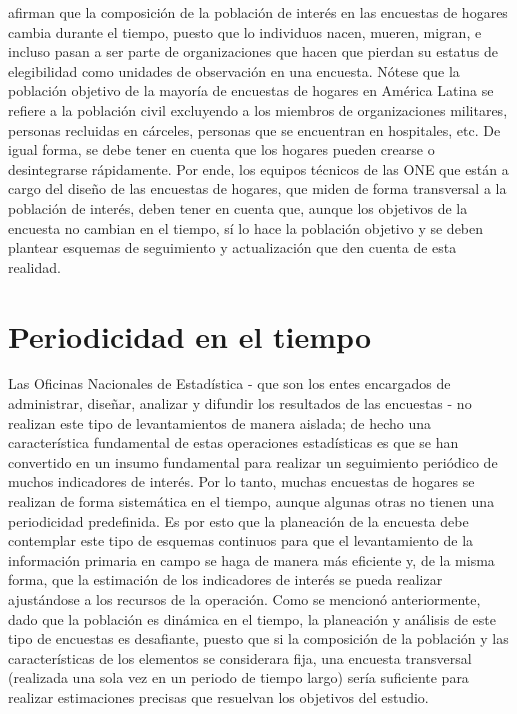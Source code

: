 \documentclass[
  12pt,
]{book}
\begin{document}
\citet[pág. 105]{Duncan_Kalton_1987} afirman que la composición de la población de interés en las encuestas de hogares cambia durante el tiempo, puesto que lo individuos nacen, mueren, migran, e incluso pasan a ser parte de organizaciones que hacen que pierdan su estatus de elegibilidad como unidades de observación en una encuesta. Nótese que la población objetivo de la mayoría de encuestas de hogares en América Latina se refiere a la población civil excluyendo a los miembros de organizaciones militares, personas recluidas en cárceles, personas que se encuentran en hospitales, etc. De igual forma, se debe tener en cuenta que los hogares pueden crearse o desintegrarse rápidamente. Por ende, los equipos técnicos de las ONE que están a cargo del diseño de las encuestas de hogares, que miden de forma transversal a la población de interés, deben tener en cuenta que, aunque los objetivos de la encuesta no cambian en el tiempo, sí lo hace la población objetivo y se deben plantear esquemas de seguimiento y actualización que den cuenta de esta realidad.

\hypertarget{periodicidad-en-el-tiempo}{%
\section{Periodicidad en el tiempo}\label{periodicidad-en-el-tiempo}}

Las Oficinas Nacionales de Estadística - que son los entes encargados de administrar, diseñar, analizar y difundir los resultados de las encuestas - no realizan este tipo de levantamientos de manera aislada; de hecho una característica fundamental de estas operaciones estadísticas es que se han convertido en un insumo fundamental para realizar un seguimiento periódico de muchos indicadores de interés. Por lo tanto, muchas encuestas de hogares se realizan de forma sistemática en el tiempo, aunque algunas otras no tienen una periodicidad predefinida. Es por esto que la planeación de la encuesta debe contemplar este tipo de esquemas continuos para que el levantamiento de la información primaria en campo se haga de manera más eficiente y, de la misma forma, que la estimación de los indicadores de interés se pueda realizar ajustándose a los recursos de la operación. Como se mencionó anteriormente, dado que la población es dinámica en el tiempo, la planeación y análisis de este tipo de encuestas es desafiante, puesto que si la composición de la población y las características de los elementos se considerara fija, una encuesta transversal (realizada una sola vez en un periodo de tiempo largo) sería suficiente para realizar estimaciones precisas que resuelvan los objetivos del estudio.
\end{document}
